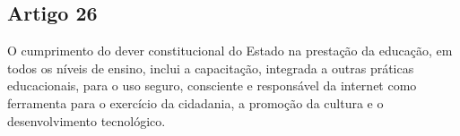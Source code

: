 \subsection{Artigo 26}
O cumprimento do dever constitucional do Estado na prestação da educação, em todos os níveis de ensino, inclui a capacitação, integrada a outras práticas educacionais, para o uso seguro, consciente e responsável da internet como ferramenta para o exercício da cidadania, a promoção da cultura e o desenvolvimento tecnológico.